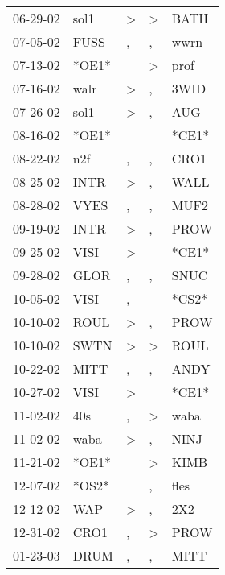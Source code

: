 \begin{supertabular}{lllll}
 06-29-02 &   sol1 &     \textgreater &     \textgreater &   BATH \\
 07-05-02 &   FUSS &                , &                , &   wwrn \\
 07-13-02 &  *OE1* &                  &     \textgreater &   prof \\
 07-16-02 &   walr &     \textgreater &                , &   3WID \\
 07-26-02 &   sol1 &     \textgreater &                , &    AUG \\
 08-16-02 &  *OE1* &                  &                  &  *CE1* \\
 08-22-02 &    n2f &                , &                , &   CRO1 \\
 08-25-02 &   INTR &     \textgreater &                , &   WALL \\
 08-28-02 &   VYES &                , &                , &   MUF2 \\
 09-19-02 &   INTR &     \textgreater &                , &   PROW \\
 09-25-02 &   VISI &     \textgreater &                  &  *CE1* \\
 09-28-02 &   GLOR &                , &                , &   SNUC \\
 10-05-02 &   VISI &                , &                  &  *CS2* \\
 10-10-02 &   ROUL &     \textgreater &                , &   PROW \\
 10-10-02 &   SWTN &     \textgreater &     \textgreater &   ROUL \\
 10-22-02 &   MITT &                , &                , &   ANDY \\
 10-27-02 &   VISI &     \textgreater &                  &  *CE1* \\
 11-02-02 &    40s &                , &     \textgreater &   waba \\
 11-02-02 &   waba &     \textgreater &                , &   NINJ \\
 11-21-02 &  *OE1* &                  &     \textgreater &   KIMB \\
 12-07-02 &  *OS2* &                  &                , &   fles \\
 12-12-02 &    WAP &     \textgreater &                , &    2X2 \\
 12-31-02 &   CRO1 &                , &     \textgreater &   PROW \\
 01-23-03 &   DRUM &                , &                , &   MITT \\

\end{supertabular}
